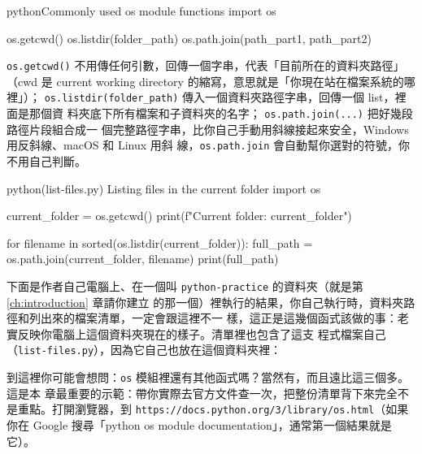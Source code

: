 \begin{code}{python}{Commonly used os module functions}
import os

os.getcwd()
os.listdir(folder_path)
os.path.join(path_part1, path_part2)
\end{code}

\texttt{os.getcwd()} 不用傳任何引數，回傳一個字串，代表「目前所在的資料夾路徑」（cwd
是 current working directory 的縮寫，意思就是「你現在站在檔案系統的哪裡」）；
\texttt{os.listdir(folder\_path)} 傳入一個資料夾路徑字串，回傳一個 list，裡面是那個資
料夾底下所有檔案和子資料夾的名字；
\texttt{os.path.join(...)} 把好幾段路徑片段組合成一
個完整路徑字串，比你自己手動用斜線接起來安全，Windows 用反斜線、macOS 和 Linux 用斜
線，\texttt{os.path.join} 會自動幫你選對的符號，你不用自己判斷。

\begin{example}{python}{(list-files.py) Listing files in the current folder}
import os

current_folder = os.getcwd()
print(f"Current folder: {current_folder}")

for filename in sorted(os.listdir(current_folder)):
    full_path = os.path.join(current_folder, filename)
    print(full_path)
\end{example}

下面是作者自己電腦上、在一個叫 \texttt{python-practice} 的資料夾（就是第 \ref{ch:introduction} 章請你建立
的那一個）裡執行的結果，你自己執行時，資料夾路徑和列出來的檔案清單，一定會跟這裡不一
樣，這正是這幾個函式該做的事：老實反映你電腦上這個資料夾現在的樣子。清單裡也包含了這支
程式檔案自己（\texttt{list-files.py}），因為它自己也放在這個資料夾裡：


到這裡你可能會想問：\texttt{os} 模組裡還有其他函式嗎？當然有，而且遠比這三個多。這是本
章最重要的示範：帶你實際去官方文件查一次，把整份清單背下來完全不是重點。打開瀏覽器，到
\texttt{https://docs.python.org/3/library/os.html}（如果你在 Google 搜尋「python os
module documentation」，通常第一個結果就是它）。

